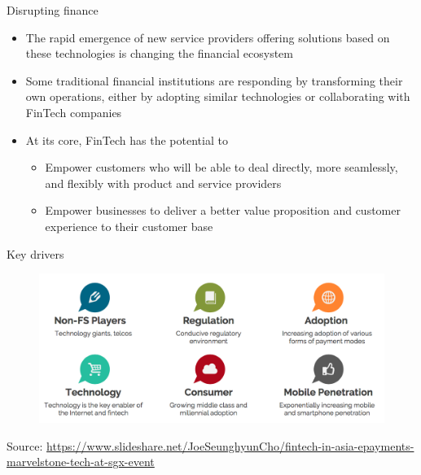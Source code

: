 \documentclass[11pt]{beamer}
\begin{document}

\begin{frame}{Disrupting finance}
	\begin{itemize}
		\item The rapid emergence of new service providers offering solutions based on these technologies is changing the financial ecosystem
		\item Some traditional financial institutions are responding by transforming their own operations, either by adopting similar technologies or collaborating with FinTech companies
		\item At its core, FinTech has the potential to
		\begin{itemize}
			\item Empower customers who will be able to deal directly, more seamlessly, and flexibly with product and service providers
			\item Empower businesses to deliver a better value proposition and customer experience to their customer base
		\end{itemize}
	\end{itemize}
\end{frame}


\begin{frame}{Key drivers}
	\begin{figure}[]
		\centering
		\includegraphics  [scale=0.25]{Images/drivers.png}
	\end{figure}
	\begin{tiny}
		Source: \href{https://www.slideshare.net/JoeSeunghyunCho/fintech-in-asia-epayments-marvelstone-tech-at-sgx-event}{https://www.slideshare.net/JoeSeunghyunCho/fintech-in-asia-epayments-marvelstone-tech-at-sgx-event}
	\end{tiny}
\end{frame}
\end{document}
